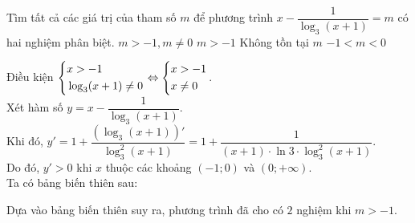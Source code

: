 \begin{ex}%
	Tìm tất cả các giá trị của tham số $m$ để phương trình $x-\dfrac{1}{\log_3 (x+1)}=m$ có hai nghiệm phân biệt.
	\choice
	{$m>-1, m\ne0$}
	{\True $m>-1$}
	{Không tồn tại $m$}
	{$-1<m<0$}
	\loigiai
	{
		Điều kiện $\left\{\begin{aligned}&x>-1\\&\log_3 (x+1) \ne 0\end{aligned}\right. \Leftrightarrow \left\{\begin{aligned}&x>-1\\&x \ne 0\end{aligned}\right.$.\\
		Xét hàm số $y=x-\dfrac{1}{\log_3 (x+1)}$. \\
		Khi đó, $y'=1+\dfrac{\left(\log_3 (x+1)\right)'}{\log_3^2(x+1)}=1+\dfrac{1}{(x+1)\cdot \ln3 \cdot \log_3^2(x+1)}$.\\
		Do đó, $y'>0$ khi $x$ thuộc các khoảng $(-1;0)$ và $(0;+\infty)$.\\
		Ta có bảng biến thiên sau:
		\begin{center}
		\end{center}
		\vspace{-2ex}
		Dựa vào bảng biến thiên suy ra, phương trình đã cho có $2$ nghiệm khi $m>-1$.
	}
\end{ex}

